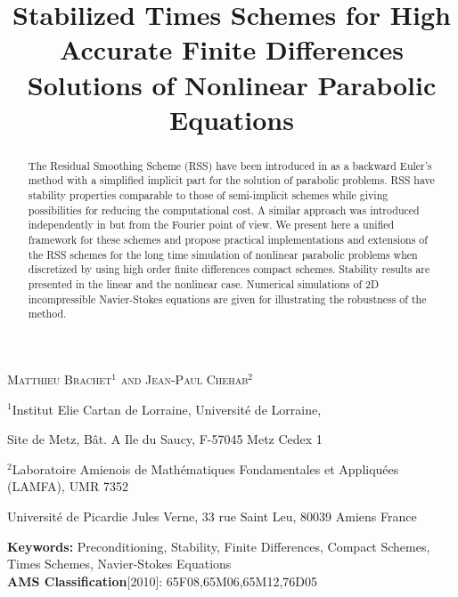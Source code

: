 \documentclass[11pt]{article}
\begin{document}
\title{Stabilized Times Schemes for  High Accurate Finite Differences Solutions of Nonlinear Parabolic Equations}
\maketitle
\centerline{\scshape Matthieu Brachet$^{1}$ and Jean-Paul Chehab$^2$ 
}
\medskip
\centerline{$^{1}${\footnotesize Institut Elie Cartan de Lorraine, Universit\'e de Lorraine,  }} 
 \centerline{{\footnotesize Site de Metz, B\^at. A Ile du Saucy, F-57045 Metz Cedex 1 }}
{%
\centerline{$^{2}${\footnotesize Laboratoire Amienois de Math\'ematiques Fondamentales et Appliqu\'ees (LAMFA), {\small UMR} 7352}}
  \centerline{{\footnotesize Universit\'e de Picardie Jules Verne, 33 rue Saint Leu, 80039 Amiens France} }
  

\begin{abstract}
The Residual Smoothing Scheme (RSS) have been introduced in \cite{AverbuchCohenIsraeli} as a backward Euler's method with a simplified implicit part for the solution of parabolic problems. RSS have stability properties comparable to those of  semi-implicit schemes while giving possibilities for reducing  the computational cost. A similar approach was introduced independently in \cite{BCostaPHD,CDGT} but from the Fourier point of view. We present here
a unified  framework for these schemes and propose practical  implementations and extensions of the RSS schemes for the long time simulation of nonlinear parabolic problems when discretized by using high order finite differences compact schemes. Stability results are presented in the linear and the nonlinear case. Numerical simulations of 2D incompressible Navier-Stokes equations are given for illustrating the robustness of the method.
\end{abstract}
{\small 
{\bf Keywords:} {Preconditioning, Stability, Finite Differences, Compact Schemes, Times Schemes, Navier-Stokes Equations}\\
\hskip 0.2in{\bf  AMS Classification}[2010]: {65F08,65M06,65M12,76D05}}\\
}
\end{document}
